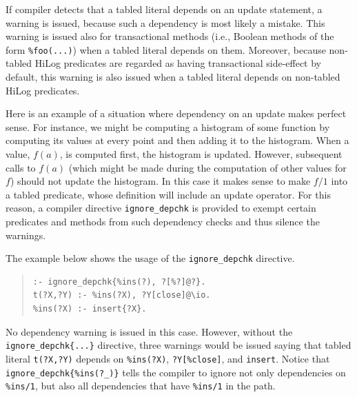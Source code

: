 \documentclass[11pt]{article}
\newcommand{\FLORA}{{\mbox{\smaller{\sc ${\cal F}${lora}\rm\emph{-2}}}}\xspace}
\newcommand{\ERGO}{\mbox{\smaller{\ensuremath{\cal{E}}\smaller{{\sc{RGO}}}}}\xspace}
\newcommand{\FLSYSTEM}{\ERGO}
\begin{document}
If \FLSYSTEM compiler detects that a tabled literal depends on an update
statement, a warning is issued, because such a dependency is most likely a
mistake. This warning is issued also for transactional methods (i.e.,
Boolean methods of the form {\tt \%foo(...)}) when a tabled literal depends
on them. Moreover, because non-tabled HiLog predicates are regarded as having
transactional side-effect by default, this warning is also issued when a
tabled literal depends on non-tabled HiLog predicates.


\label{page-histogram}
Here is an example of a situation where
dependency on an update makes perfect
sense. For instance, we might be computing a histogram of some function
by computing its values at every point and then adding it to the
histogram. When a value, $f(a)$, is computed first, the histogram is
updated. However, subsequent calls to $f(a)$ (which might be made during
the computation of other values for $f$) should not update the histogram.
In this case it makes sense to make $f/1$ into a tabled predicate, whose
definition will include an update operator. For this reason, a compiler
directive {\tt ignore\_depchk} is provided to exempt certain predicates
and methods from such dependency checks and thus silence the warnings.

The example below shows the usage of the {\tt ignore\_depchk} directive.
\begin{quote}
\begin{verbatim}
:- ignore_depchk{%ins(?), ?[%?]@?}.
t(?X,?Y) :- %ins(?X), ?Y[close]@\io. 
%ins(?X) :- insert{?X}. 
\end{verbatim}
\end{quote}
No dependency warning is issued in this case. However, without the
{\tt ignore\_depchk\{...\}} directive, three warnings would be issued saying that
tabled literal {\tt t(?X,?Y)} depends on {\tt \%ins(?X)}, {\tt ?Y[\%close]},
and {\tt insert}. Notice that {\tt ignore\_depchk\{\%ins(?\_)\}} tells the
compiler to ignore not only dependencies on {\tt \%ins/1}, but also all
dependencies that have {\tt \%ins/1} in the path.
\end{document}
